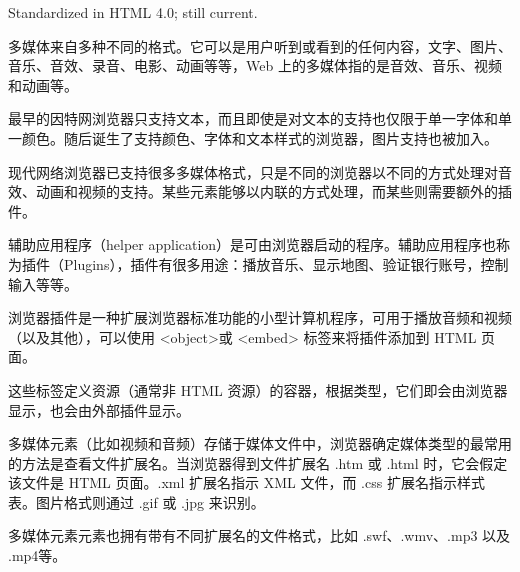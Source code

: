 Standardized in HTML 4.0; still current.

多媒体来自多种不同的格式。它可以是用户听到或看到的任何内容，文字、图片、音乐、音效、录音、电影、动画等等，Web 上的多媒体指的是音效、音乐、视频和动画等。



最早的因特网浏览器只支持文本，而且即使是对文本的支持也仅限于单一字体和单一颜色。随后诞生了支持颜色、字体和文本样式的浏览器，图片支持也被加入。

现代网络浏览器已支持很多多媒体格式，只是不同的浏览器以不同的方式处理对音效、动画和视频的支持。某些元素能够以内联的方式处理，而某些则需要额外的插件。

辅助应用程序（helper application）是可由浏览器启动的程序。辅助应用程序也称为插件（Plugins），插件有很多用途：播放音乐、显示地图、验证银行账号，控制输入等等。

浏览器插件是一种扩展浏览器标准功能的小型计算机程序，可用于播放音频和视频（以及其他），可以使用 <object>或 <embed> 标签来将插件添加到 HTML 页面。

这些标签定义资源（通常非 HTML 资源）的容器，根据类型，它们即会由浏览器显示，也会由外部插件显示。

多媒体元素（比如视频和音频）存储于媒体文件中，浏览器确定媒体类型的最常用的方法是查看文件扩展名。当浏览器得到文件扩展名 .htm 或 .html 时，它会假定该文件是 HTML 页面。.xml 扩展名指示 XML 文件，而 .css 扩展名指示样式表。图片格式则通过 .gif 或 .jpg 来识别。


多媒体元素元素也拥有带有不同扩展名的文件格式，比如 .swf、.wmv、.mp3 以及 .mp4等。

